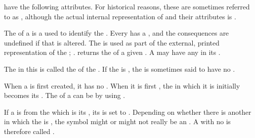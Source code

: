  have the following attributes. 
For historical reasons,
these are sometimes referred to as , although the actual
internal representation of  and their attributes is
.

\beginlist

 
The  of a  is a  used to identify the .
Every  has a , 
and the consequences are undefined if that  is altered.  
The  is used as part of the external, printed representation of
the ; \seesection\CharacterSyntax.
 returns the  of a given .
A  may have any  in its .



The  in this  is called the  
of the .  If the  is \nil, the 
is sometimes said to have no .

When a  is first created, it has no .
When it is first , the  in which it is
initially  becomes its .
The  of a  can be 
by using .

If a  is  from the  
which is its , its  is set to \nil.
Depending on whether there is another  in which the 
is , the symbol might or might not really be an  .
A  with no  is therefore called 
.

